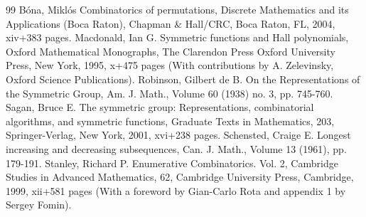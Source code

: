 \documentclass[10pt]{amsart}
\begin{document}
\begin{thebibliography}{99}
 Bóna, Miklós Combinatorics of permutations, Discrete Mathematics and its Applications (Boca Raton), Chapman \& Hall/CRC, Boca Raton, FL, 2004, xiv+383 pages.
 Macdonald, Ian G. Symmetric functions and Hall polynomials, Oxford Mathematical Monographs, The Clarendon Press Oxford University Press, New York, 1995, x+475 pages (With contributions by A. Zelevinsky, Oxford Science Publications).
 Robinson, Gilbert de B. On the Representations of the Symmetric Group, Am. J. Math., Volume 60 (1938) no. 3, pp. 745-760.
 Sagan, Bruce E. The symmetric group: Representations, combinatorial algorithms, and symmetric functions, Graduate Texts in Mathematics, 203, Springer-Verlag, New York, 2001, xvi+238 pages.
 Schensted, Craige E. Longest increasing and decreasing subsequences, Can. J. Math., Volume 13 (1961), pp. 179-191.
 Stanley, Richard P. Enumerative Combinatorics. Vol. 2, Cambridge Studies in Advanced Mathematics, 62, Cambridge University Press, Cambridge, 1999, xii+581 pages (With a foreword by Gian-Carlo Rota and appendix 1 by Sergey Fomin).
\end{thebibliography}
\end{document}
